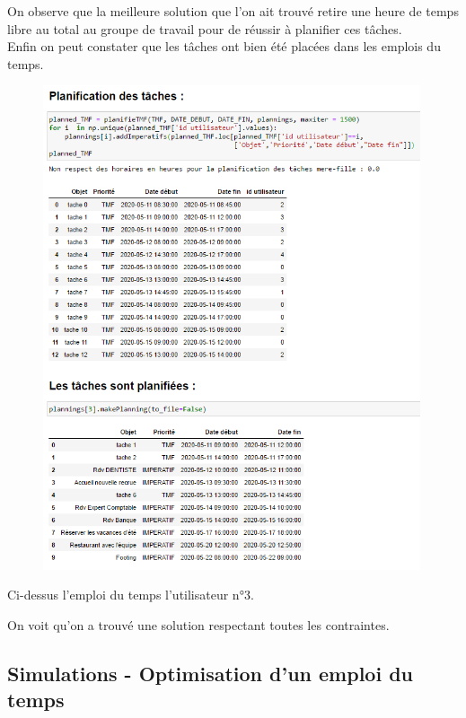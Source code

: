 \documentclass[12pt]{article}
\begin{document}
On observe que la meilleure solution que l'on ait trouvé retire une heure de temps libre au total au groupe de travail pour de réussir à planifier ces tâches.\\

Enfin on peut constater que les tâches ont bien été placées dans les emplois du temps.


\newpage
\begin{figure}[H]
\begin{center}
\includegraphics[width=0.99\textwidth]{tmu3}
\end{center}
\end{figure}

Ci-dessus l'emploi du temps l'utilisateur n°3.

On voit qu'on a trouvé une solution respectant toutes les contraintes. 

\newpage
\subsection{Simulations - Optimisation d'un emploi du temps}
\end{document}
